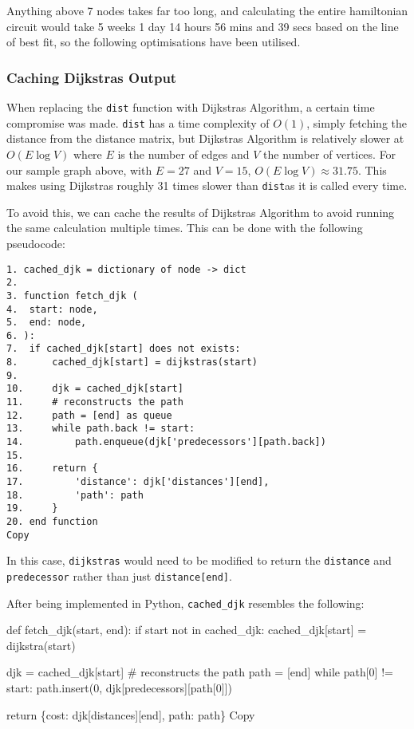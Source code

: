 \documentclass[
]{article}
\newenvironment{Shaded}{}{}
\newcommand{\NormalTok}[1]{#1}
\begin{document}
Anything above 7 nodes takes far too long, and calculating the entire
hamiltonian circuit would take 5 weeks 1 day 14 hours 56 mins and 39
secs based on the line of best fit, so the following optimisations have
been utilised.

\hypertarget{caching-dijkstras-output}{%
\subsubsection{Caching Dijkstra\textquotesingle s
Output}\label{caching-dijkstras-output}}

When replacing the \texttt{dist} function with
Dijkstra\textquotesingle s Algorithm, a certain time compromise was
made. \texttt{dist} has a time complexity of {\(O(1)\)}, simply fetching
the distance from the distance matrix, but Dijkstra\textquotesingle s
Algorithm is relatively slower at {\(O(E\log V)\)} where {\(E\)} is the
number of edges and {\(V\)} the number of vertices. For our sample graph
above, with {\(E = 27\)} and {\(V = 15\)},
{\(O(E\log V) \approx 31.75\)}. This makes using
Dijkstra\textquotesingle s roughly 31 times slower than \texttt{dist}as
it is called every time.

To avoid this, we can cache the results of Dijkstra\textquotesingle s
Algorithm to avoid running the same calculation multiple times. This can
be done with the following pseudocode:

\begin{verbatim}
1. cached_djk = dictionary of node -> dict
2. 
3. function fetch_djk (
4.  start: node, 
5.  end: node, 
6. ):
7.  if cached_djk[start] does not exists:
8.      cached_djk[start] = dijkstras(start)
9.  
10.     djk = cached_djk[start]
11.     # reconstructs the path  
12.     path = [end] as queue  
13.     while path.back != start:  
14.         path.enqueue(djk['predecessors'][path.back])
15.     
16.     return {
17.         'distance': djk['distances'][end], 
18.         'path': path
19.     }
20. end function
Copy
\end{verbatim}

In this case, \texttt{dijkstras} would need to be modified to return the
\texttt{distance} and \texttt{predecessor} rather than just
\texttt{distance{[}end{]}}.

After being implemented in Python, \texttt{cached\_djk} resembles the
following:

\begin{Shaded}
\begin{Highlighting}[]
\NormalTok{def fetch\_djk(start, end):}
\NormalTok{    if start not in cached\_djk:}
\NormalTok{        cached\_djk[start] = dijkstra(start)}

\NormalTok{    djk = cached\_djk[start]}
\NormalTok{    \# reconstructs the path}
\NormalTok{    path = [end]}
\NormalTok{    while path[0] != start:}
\NormalTok{        path.insert(0, djk[\textquotesingle{}predecessors\textquotesingle{}][path[0]])}

\NormalTok{    return \{\textquotesingle{}cost\textquotesingle{}: djk[\textquotesingle{}distances\textquotesingle{}][end], \textquotesingle{}path\textquotesingle{}: path\}}
\NormalTok{Copy}
\end{Highlighting}
\end{Shaded}
\end{document}
